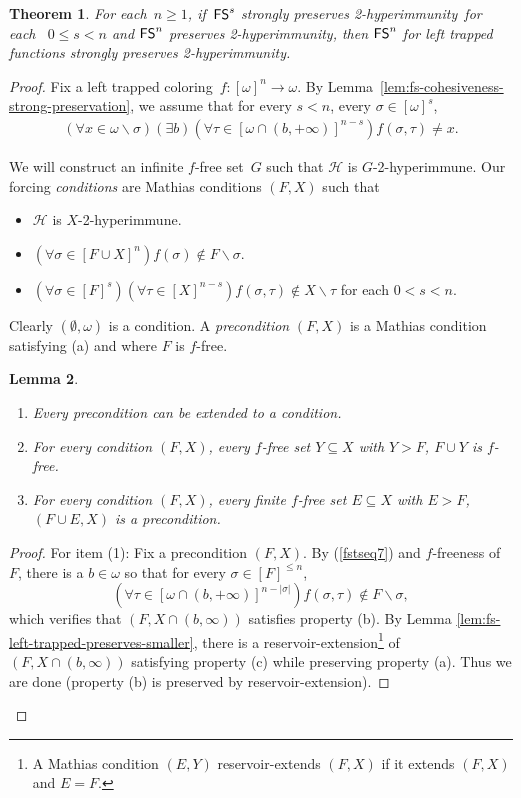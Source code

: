 \documentclass{amsart}
\newtheorem{theorem}{Theorem}[section]
\newtheorem{lemma}[theorem]{Lemma}
\theoremstyle{definition}
\theoremstyle{remark}
\numberwithin{equation}{section}
\theoremstyle{noparens}
\def\propertyL{2-hyperimmunity}
\def\hyper{2-hyperimmune}
\newcommand{\Hcal}{\mathcal{H}}
\renewcommand{\setminus}{\smallsetminus}
\newcommand{\s}[1]{\ensuremath{\sf{#1}}}
\DeclareMathOperator{\fs}{\s{FS}}
\begin{document}
\begin{theorem}\label{thm:strong-preservation-fs-left-trapped}
For each~$n \geq 1$, if~$\fs^s$ strongly preserves \propertyL\
for each~   $0\leq s<n$  and $\fs^n$ preserves \propertyL,
then $\fs^n$ for left trapped functions strongly preserves \propertyL.
\end{theorem}
\begin{proof} %
Fix  a left trapped coloring~$f : [\omega]^n \to \omega$.
By Lemma~\ref{lem:fs-cohesiveness-strong-preservation},
we assume
that
for every $s<n$, every $\sigma\in [\omega]^s$,
\begin{align}\label{fstseq7}
(\forall x \in \omega \setminus \sigma)
  (\exists b)(\forall \tau \in [\omega\cap (b, +\infty)]^{n-s})
  f(\sigma, \tau) \neq x.
\end{align}


We will construct an infinite $f$-free set~$G$ such that $\Hcal$ is $G  $-\hyper.
Our forcing \emph{conditions} are Mathias conditions $(F, X)$ such that
\begin{itemize}
  \item[(a)] $\Hcal$ is $X  $-\hyper.
  \item[(b)] $(\forall \sigma \in [F \cup X]^n) f(\sigma) \not \in F \setminus \sigma$.
  \item[(c)] $(\forall \sigma \in [F]^s)(\forall \tau \in [X]^{n-s})
  f(\sigma, \tau) \not \in X \setminus \tau$ for each   $0<s<n$.
\end{itemize}
Clearly $(\emptyset,\omega)$ is a condition.
A \emph{precondition} $(F,X)$ is a Mathias condition satisfying (a) and 
where $F$ is
$f$-free.
\begin{lemma}\label{lem:fsn-extension}
\

\begin{enumerate}
\item Every precondition can be extended to a condition.
\item For every condition  $(F,X)$, every $f$-free set $Y\subseteq X$
with $Y>F$,
$F\cup Y$ is $f$-free.
\item  For every condition  $(F,X)$, every finite $f$-free set $E\subseteq X$ with $E>F$,
 $(F\cup E, X )$ is a precondition.
\end{enumerate}
\end{lemma}
\begin{proof}
For item (1):
Fix a precondition $(F,X)$.
 By (\ref{fstseq7}) and $f$-freeness of $F$, there is a $b\in\omega$
 so that  for every $\sigma\in [F]^{\leq n}$,
 $$
 (\forall \tau \in [\omega\cap (b, +\infty)]^{n-|\sigma|})
  f(\sigma, \tau) \notin F\setminus \sigma,
  $$
which verifies that $(F,X\cap (b,\infty))$ satisfies property (b).
By Lemma \ref{lem:fs-left-trapped-preserves-smaller},
there is
a reservoir-extension\footnote{A Mathias condition $(E,Y)$
reservoir-extends $(F,X)$ if it extends $(F,X)$ and $E=F$.} of  $(F,X\cap (b,\infty))$ satisfying property (c) while preserving property (a).
Thus we are done (property (b) is preserved by reservoir-extension).


\end{proof}
\end{proof}
\end{document}
